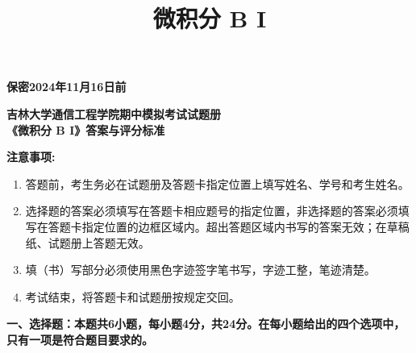 \documentclass[a4paper,12pt]{article}
\title{\CJKfamily{hei} 微积分 B I}
\date{}
\begin{document}
\noindent
\textbf{保密2024年11月16日前}\\

\begin{center}
    {\LARGE \textbf{\spaceskip=4pt 吉林大学通信工程学院期中模拟考试试题册}}\\[1.5em]
    {\LARGE \textbf{\spaceskip=4pt 《微积分 B I》答案与评分标准}}
\end{center}

\noindent
\textbf{注意事项:}
\begin{enumerate}[itemsep=0.2pt]
    \item 答题前，考生务必在试题册及答题卡指定位置上填写姓名、学号和考生姓名。
    \item 选择题的答案必须填写在答题卡相应题号的指定位置，非选择题的答案必须填写在答题卡指定位置的边框区域内。超出答题区域内书写的答案无效；在草稿纸、试题册上答题无效。
    \item 填（书）写部分必须使用黑色字迹签字笔书写，字迹工整，笔迹清楚。
    \item 考试结束，将答题卡和试题册按规定交回。
\end{enumerate}

\noindent
\textbf{一、选择题：本题共6小题，每小题4分，共24分。在每小题给出的四个选项中，只有一项是符合题目要求的。}
\end{document}
